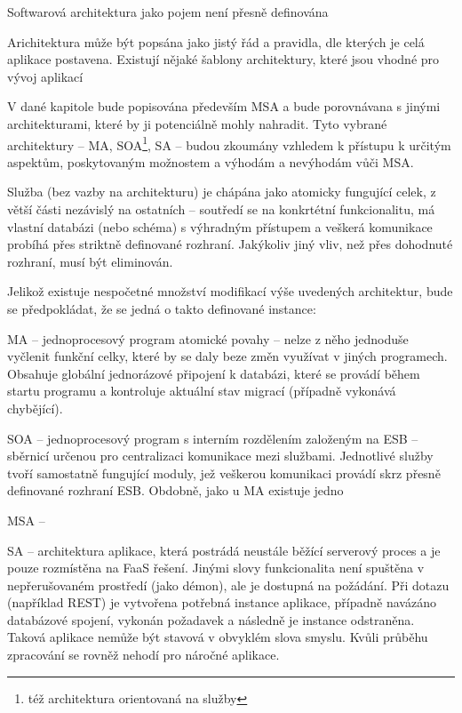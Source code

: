 

Softwarová architektura jako pojem není přesně definována \cite{softarch}

Arichitektura může být popsána jako jistý řád a pravidla, dle kterých je celá aplikace postavena.
Existují nějaké šablony architektury, které jsou vhodné pro vývoj aplikací


V dané kapitole bude popisována především \gls{MSA} a bude porovnávana s jinými architekturami, které by ji potenciálně mohly nahradit.
Tyto vybrané architektury – \gls{MA}, \gls{SOA}\footnote{též architektura orientovaná na služby}, \gls{SA} – budou zkoumány vzhledem k přístupu k určitým aspektům, poskytovaným možnostem a výhodám a nevýhodám vůči \gls{MSA}.



Služba (bez vazby na architekturu) je chápána jako atomicky fungující celek, z větší části nezávislý na ostatních – soutředí se na konkrtétní funkcionalitu, má vlastní databázi (nebo schéma) s výhradným přístupem a veškerá komunikace probíhá přes striktně definované rozhraní.
Jakýkoliv jiný vliv, než přes dohodnuté rozhraní, musí být eliminován.

Jelikož existuje nespočetné množství modifikací výše uvedených architektur, bude se předpokládat, že se jedná o takto definované instance:



\begin{dl}
   \item[\gls{MA}] – jednoprocesový program atomické povahy – nelze z něho jednoduše vyčlenit funkční celky, které by se daly beze změn využívat v jiných programech.
   Obsahuje globální jednorázové připojení k databázi, které se provádí během startu programu a kontroluje aktuální stav migrací (případně vykonává chybějící).
   \item[\gls{SOA}] – jednoprocesový program s interním rozdělením založeným na \gls{ESB} – sběrnicí určenou pro centralizaci komunikace mezi službami.
   Jednotlivé služby tvoří samostatně fungující moduly, jež veškerou komunikaci provádí skrz přesně definované rozhraní \gls{ESB}.
   Obdobně, jako u \gls{MA} existuje jedno
   \item[\gls{MSA}] –
   \item[\gls{SA}] – architektura aplikace, která postrádá neustále běžící serverový proces a je pouze rozmístěna na \gls{FaaS} řešení.
   Jinými slovy funkcionalita není spuštěna v nepřerušovaném prostředí (jako démon), ale je dostupná na požádání.
   Při dotazu (například REST) je vytvořena potřebná instance aplikace, případně navázáno databázové spojení, vykonán požadavek a následně je instance odstraněna.
   Taková aplikace nemůže být stavová v obvyklém slova smyslu.
   Kvůli průběhu zpracování se rovněž nehodí pro náročné aplikace. 
\end{dl}

